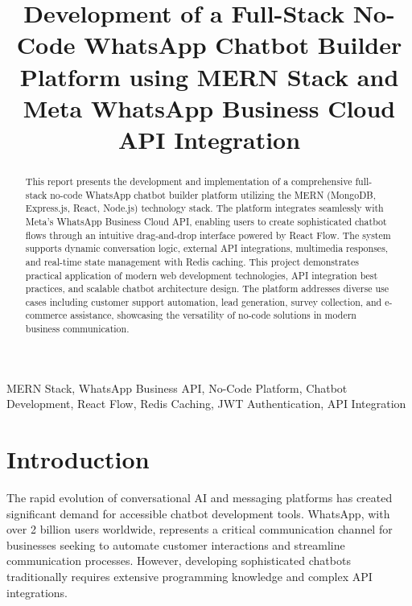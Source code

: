 \documentclass[conference]{IEEEtran}
\begin{document}
\title{Development of a Full-Stack No-Code WhatsApp Chatbot Builder Platform using MERN Stack and Meta WhatsApp Business Cloud API Integration}

\author{
}

\maketitle

\begin{abstract}
This report presents the development and implementation of a comprehensive full-stack no-code WhatsApp chatbot builder platform utilizing the MERN (MongoDB, Express.js, React, Node.js) technology stack. The platform integrates seamlessly with Meta's WhatsApp Business Cloud API, enabling users to create sophisticated chatbot flows through an intuitive drag-and-drop interface powered by React Flow. The system supports dynamic conversation logic, external API integrations, multimedia responses, and real-time state management with Redis caching. This project demonstrates practical application of modern web development technologies, API integration best practices, and scalable chatbot architecture design. The platform addresses diverse use cases including customer support automation, lead generation, survey collection, and e-commerce assistance, showcasing the versatility of no-code solutions in modern business communication.
\end{abstract}

\begin{IEEEkeywords}
MERN Stack, WhatsApp Business API, No-Code Platform, Chatbot Development, React Flow, Redis Caching, JWT Authentication, API Integration
\end{IEEEkeywords}

\section{Introduction}

The rapid evolution of conversational AI and messaging platforms has created significant demand for accessible chatbot development tools. WhatsApp, with over 2 billion users worldwide, represents a critical communication channel for businesses seeking to automate customer interactions and streamline communication processes. However, developing sophisticated chatbots traditionally requires extensive programming knowledge and complex API integrations.
\end{document}
